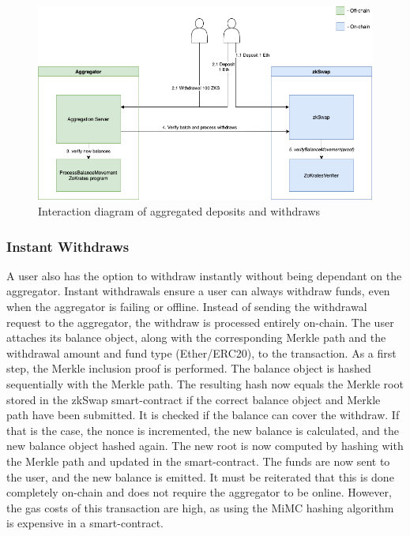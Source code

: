 \documentclass[../../thesis.tex]{subfiles}
\begin{document}
\begin{figure}[h]
    \centerline{\includegraphics[totalheight=8cm]{diagrams/depWithFlow.png}}
    \caption{Interaction diagram of aggregated deposits and withdraws}
    \label{fig:depWithFlow}
\end{figure}

\subsubsection{Instant Withdraws}
A user also has the option to withdraw instantly without being dependant on the aggregator. Instant withdrawals ensure a user can always withdraw funds, even when the aggregator is failing or offline. Instead of sending the withdrawal request to the aggregator, the withdraw is processed entirely on-chain. The user attaches its balance object, along with the corresponding Merkle path and the withdrawal amount and fund type (Ether/ERC20), to the transaction. As a first step, the Merkle inclusion proof is performed. The balance object is hashed sequentially with the Merkle path. The resulting hash now equals the Merkle root stored in the zkSwap smart-contract if the correct balance object and Merkle path have been submitted. It is checked if the balance can cover the withdraw. If that is the case, the nonce is incremented, the new balance is calculated, and the new balance object hashed again. The new root is now computed by hashing with the Merkle path and updated in the smart-contract. The funds are now sent to the user, and the new balance is emitted. It must be reiterated that this is done completely on-chain and does not require the aggregator to be online. However, the gas costs of this transaction are high, as using the MiMC hashing algorithm is expensive in a smart-contract.
\end{document}
